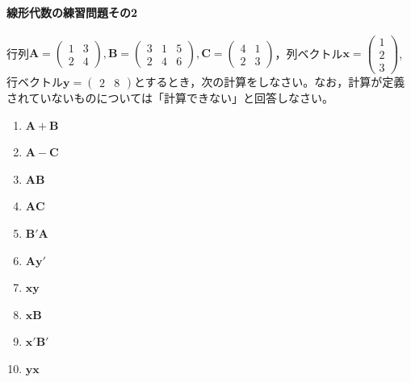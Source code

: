 \documentclass{ltjsbook}
\begin{document}
\paragraph{線形代数の練習問題その2}行列$\bm{A}=\begin{pmatrix}1 & 3 \\2 & 4\end{pmatrix},\bm{B}=\begin{pmatrix}3&1&5\\2&4&6\end{pmatrix},\bm{C}=\begin{pmatrix}4&1\\2&3\end{pmatrix}$，列ベクトル$\bm{x}=\begin{pmatrix}1\\2\\3\end{pmatrix}$,行ベクトル$\bm{y}=\begin{pmatrix}2&8\end{pmatrix}$とするとき，次の計算をしなさい。なお，計算が定義されていないものについては「計算できない」と回答しなさい。
\begin{enumerate}
    \item $\bm{A}+\bm{B}$
    \item $\bm{A}-\bm{C}$
    \item $\bm{AB}$
    \item $\bm{AC}$
    \item $\bm{B}'\bm{A}$
    \item $\bm{A}\bm{y}'$
    \item $\bm{xy}$
    \item $\bm{xB}$
    \item $\bm{x}'\bm{B}'$
    \item $\bm{yx}$
\end{enumerate}
\end{document}
